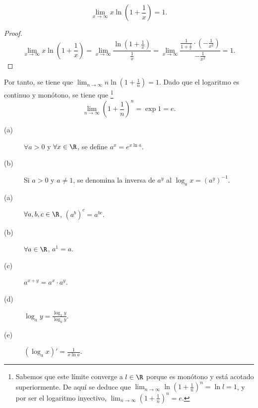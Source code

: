 \begin{ftheorem}[]
\normalfont 
\[\lim_{x \to \infty}x\ln\left(1+\frac{1}{x}\right) = 1 .\]
\end{ftheorem}
\begin{proof}
\[\lim_{x \to \infty}x\ln\left(1+\frac{1}{x}\right) = \lim_{x \to \infty}\frac{\ln\left(1+\frac{1}{x}\right)}{\frac{1}{x}} = \lim_{x \to \infty} \frac{\frac{1}{1+\frac{1}{x}} \cdot \left(-\frac{1}{x^{2}}\right)}{-\frac{1}{x^{2}}} = 1 .\]
\end{proof}
\begin{observation}
\normalfont Por tanto, se tiene que $\displaystyle \lim_{n \to \infty}n\ln\left(1 + \frac{1}{n}\right) = 1$. Dado que el logaritmo es continuo y monótono, se tiene que \footnote{Sabemos que este límite converge a $\displaystyle l \in \R $ porque es monótono y está acotado superiormente. De aquí se deduce que $\displaystyle \lim_{n \to \infty}\ln\left(1 + \frac{1}{n}\right)^{n} = \ln l = 1 $, y por ser el logaritmo inyectivo, $\displaystyle \lim_{n \to \infty}\left(1+\frac{1}{n}\right)^{n} = e $.} 
\[ \lim_{n \to \infty}\left(1 + \frac{1}{n}\right)^{n} = \exp 1 = e .\]
\end{observation}
\begin{fdefinition}[]
\normalfont 
\begin{description}
\item[(a)] $\displaystyle \forall a > 0 $ y $\displaystyle \forall x \in \R $, se define $\displaystyle a^{x} = e^{x\ln a}  $.
\item[(b)] Si $\displaystyle a > 0 $ y $\displaystyle a \neq 1 $, se denomina la inversa de $\displaystyle a^{y} $ al $\displaystyle \log_{a}x = \left(a^{y}\right)^{-1} $.
\end{description}
\end{fdefinition}
\begin{fprop}[]
\normalfont 
\begin{description}
\item[(a)] $\displaystyle \forall a,b,c \in \R $, $\displaystyle \left(a^{b}\right)^{c} = a^{bc} $.
\item[(b)] $\displaystyle \forall a \in \R $, $\displaystyle a^{1} = a $.
\item[(c)] $\displaystyle a^{x + y}= a^{x} \cdot a^{y} $.
\item[(d)] $\displaystyle \log_{a} y= \frac{\log_{x}y}{\log_{a}y} $.
\item[(e)] $\displaystyle \left(\log_{a}x\right)' = \frac{1}{x\ln a} $.
\end{description}
\end{fprop}
